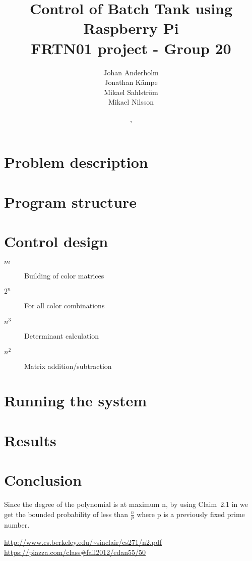 \documentclass{article}
\title{Control of Batch Tank using Raspberry Pi \\ FRTN01 project - Group 20}
\date{\GITDate,\\\small\GITAbrHash}
\author{Johan Anderholm \\ Jonathan Kämpe \\ Mikael Sahlström \\ Mikael Nilsson}
\begin{document}
\maketitle
\newpage
\tableofcontents
\newpage
\section{Problem description}

\section{Program structure}

\section{Control design}
\begin{description}
\item[$m$] Building of color matrices
\item[$2^n$] For all color combinations
\item[$n^3$] Determinant calculation
\item[$n^2$] Matrix addition/subtraction
\end{description}


\section{Running the system}

\section{Results}

\section{Conclusion}

Since the degree of the polynomial is at maximum n, by using Claim~2.1 in \cite[p.~2-1]{alistair} we get the bounded probability of less than $\frac{n}{p}$ where p is a previously fixed prime number.

\newpage

\begin{thebibliography}{9}
\url{http://www.cs.berkeley.edu/~sinclair/cs271/n2.pdf}
\url{https://piazza.com/class#fall2012/edan55/50}
\end{thebibliography}
\end{document}
